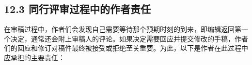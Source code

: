 \subsection*{12.3 同行评审过程中的作者责任}
在审稿过程中，作者们会发现自己需要等待那个预期时刻的到来，即编辑返回第一个决定，通常还会附上审稿人的评论。如果决定需要回应并提交修改的手稿，作者们的回应和修订对稿件最终被接受或拒绝至关重要。为此，以下是作者在此过程中应承担的主要责任：


